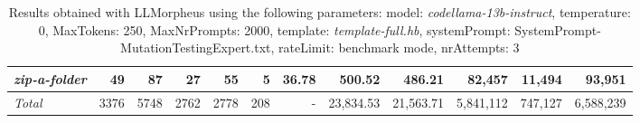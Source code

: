 \begin{table*}
{\begin{tabular}{l||r|r|r|r|r|r||r|r||r|r|r}
   \hline
   \textit{zip-a-folder} & 49 & 87 & 27 & 55 & 5 & 36.78 & 500.52 & 486.21 & 82,457 & 11,494 & 93,951 \\ 
   \hline
   \textit{Total} & 3376 & 5748 & 2762 & 2778 & 208 & - & 23,834.53  & 21,563.71 & 5,841,112 & 747,127 & 6,588,239 \\ 
 \end{tabular}
 }
 \caption{Results obtained with LLMorpheus using the following parameters: 
   model: \textit{codellama-13b-instruct}, 
   temperature: 0, 
   MaxTokens: 250, 
   MaxNrPrompts: 2000, 
   template: \textit{template-full.hb}, 
   systemPrompt: SystemPrompt-MutationTestingExpert.txt, 
   rateLimit: benchmark mode, 
   nrAttempts: 3  
 }
\end{table*}

